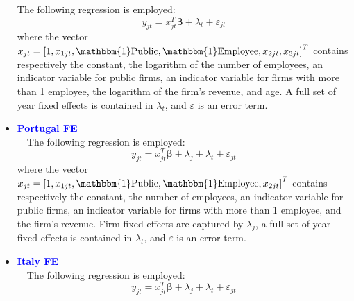 \documentclass[12pt,notitlepage]{article}
\newcommand{\sym}[1] {\ifmmode^{#1} \else\(^{#1}\) \fi}
\begin{document}
\begin{itemize}
The following regression is employed:
	\begin{equation}
	y_{jt} = x^{T}_{jt}\mathbf{\beta} + \lambda_{t} + \varepsilon_{jt}
	\end{equation}
where the vector $x_{jt} = \left[  1, x_{1jt}, \mathbbm{1}\text{Public}, \mathbbm{1}\text{Employee}, x_{2jt}, x_{3jt}  \right]^{T} $ contains respectively the constant, the logarithm of the number of employees, an indicator variable for public firms, an indicator variable for firms with more than 1 employee, the logarithm of the firm's revenue, and age. A full set of year fixed effects is contained in $\lambda_{t}$, and $\varepsilon$ is an error term.
\begin{table}[htbp]\centering
\def\sym#1{\ifmmode^{#1}\else\(^{#1}\)\fi}
\caption{Haltiwanger growth rate}
\end{table}
\clearpage
\item \textcolor{blue}{\textbf{Portugal FE}}\\~\
The following regression is employed:
	\begin{equation}
	y_{jt} = x^{T}_{jt}\mathbf{\beta} + \lambda_{j}  + \lambda_{t} + \varepsilon_{jt}
	\end{equation}
where the vector $x_{jt} = \left[  1, x_{1jt}, \mathbbm{1}\text{Public}, \mathbbm{1}\text{Employee}, x_{2jt} \right]^{T} $ contains respectively the constant, the number of employees, an indicator variable for public firms, an indicator variable for firms with more than 1 employee, and the firm's revenue. Firm fixed effects are captured by $\lambda_{j}$, a full set of year fixed effects is contained in $\lambda_{t}$, and $\varepsilon$ is an error term.
\begin{table}[htbp]\centering
\def\sym#1{\ifmmode^{#1}\else\(^{#1}\)\fi}
\caption{Haltiwanger growth rate}
\end{table}
\clearpage
\item \textcolor{blue}{\textbf{Italy FE}}\\~\
The following regression is employed:
	\begin{equation}
	y_{jt} = x^{T}_{jt}\mathbf{\beta} + \lambda_{j}  + \lambda_{t} + \varepsilon_{jt}

\end{equation}
\end{itemize}
\end{document}
